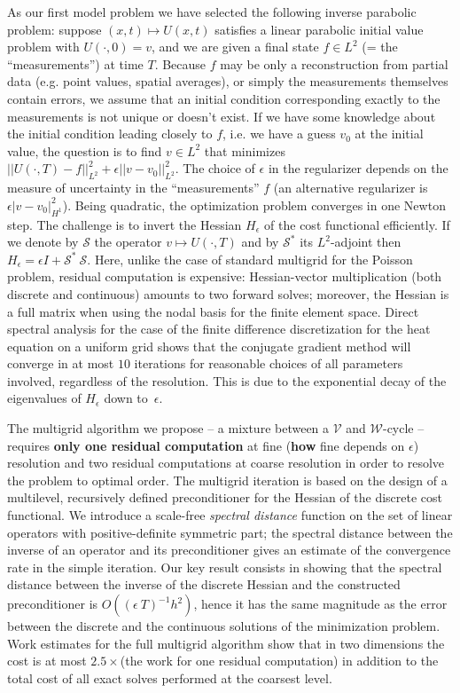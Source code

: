 \documentclass{report}
\begin{document}
As our first model problem we have selected the following inverse
parabolic problem: suppose $(x, t) \mapsto U(x, t)$ satisfies a linear
parabolic initial value problem with $U(\cdot, 0) = v$, and we are
given a final state $f\in L^2$ (= the ``measurements'') at time $T$.
Because $f$ may be only a reconstruction from partial data
(e.g. point values, spatial averages), or simply the measurements
themselves contain errors, we assume that an initial condition
corresponding exactly to the measurements is not unique or doesn't
exist. If we have some knowledge about the initial condition leading
closely to $f$, i.e. we have a guess $v_0$ at the initial value, the
question is to find $v\in L^2$ that minimizes \mbox{$|\!|U(\cdot, T)
- f|\!|_{L^2}^2 + \epsilon |\!|v - v_0|\!|_{L^2}^2$}. The choice of
$\epsilon$ in the regularizer depends on the measure of uncertainty
in the ``measurements'' $f$ (an alternative regularizer is $\epsilon
|v - v_0|_{H^1}^2$). Being quadratic, the optimization problem
converges in one Newton step. The challenge is to invert the Hessian
$H_{\epsilon}$ of the cost functional efficiently. If we denote by
${\mathcal S}$ the operator $v\mapsto U(\cdot, T)$ and by ${\mathcal
S}^*$ its $L^2$-adjoint then $H_{\epsilon} = \epsilon I + {\mathcal
S}^*\:{\mathcal S}$. Here, unlike the case of standard multigrid for
the Poisson problem, residual computation is expensive:
Hessian-vector multiplication (both discrete and continuous) amounts
to two forward solves; moreover, the Hessian is a full matrix when
using the nodal basis for the finite element space. Direct spectral
analysis for the case of the finite difference discretization for the
heat equation on a uniform grid shows that the conjugate gradient
method will converge in at most $10$ iterations for reasonable
choices of all parameters involved, regardless of the resolution. This
is due to the exponential decay of the eigenvalues of $H_{\epsilon}$
down to~$\epsilon$.

The multigrid algorithm we propose -- a mixture between a ${\mathcal
V}$ and ${\mathcal W}$-cycle -- requires {\bf only one residual
computation} at fine ({\bf how} fine depends on $\epsilon$) resolution
and two residual computations at coarse resolution in order to
resolve the problem to optimal order. The multigrid iteration is based
on the design of a multilevel, recursively defined preconditioner for
the Hessian of the discrete cost functional. We introduce a
scale-free \emph{spectral distance} function on the set of linear
operators with positive-definite symmetric part; the spectral
distance between the inverse of an operator and its preconditioner
gives an estimate of the convergence rate in the simple iteration.
Our key result consists in showing that the spectral distance between
the inverse of the discrete Hessian and the constructed preconditioner
is $O\left((\epsilon\: T)^{-1} h^2\right)$, hence it has the same
magnitude as the error between the discrete and the continuous
solutions of the minimization problem. Work estimates for the full
multigrid algorithm show that in two dimensions the cost is at most
$2.5 \times$(the work for one residual computation) in addition to
the total cost of all exact solves performed at the coarsest level.
\end{document}
